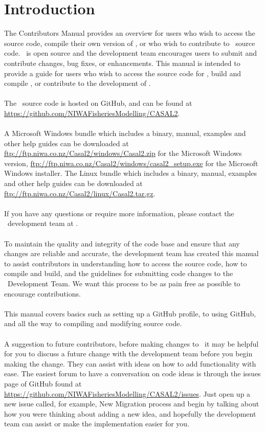 \section{Introduction\label{sec:Introduction}}
The Contributors Manual provides an overview for users who wish to access the source code, compile their own version of \CNAME , or who wish to contribute to \CNAME\ source code. \CNAME\ is open source and the development team encourages users to submit and contribute changes, bug fixes, or enhancements. This manual is intended to provide a guide for users who wish to access the source code for \CNAME , build and compile  \CNAME , or contribute to the development of \CNAME . 
\\\\
The \CNAME\ source code is hosted on GitHub, and can be found at \url{https://github.com/NIWAFisheriesModelling/CASAL2}.
\\\\
A Microsoft Windows bundle which includes a binary, manual, examples and other help guides can be downloaded at \url{ftp://ftp.niwa.co.nz/Casal2/windows/Casal2.zip} for the Microsoft Windows version, \url{ftp://ftp.niwa.co.nz/Casal2/windows/casal2_setup.exe} for the Microsoft Windows installer. The Linux bundle which includes a binary, manual, examples and other help guides can be downloaded at \url{ftp://ftp.niwa.co.nz/Casal2/linux/Casal2.tar.gz}.
\\\\
If you have any questions or require more information, please contact the \CNAME\ development team at \email.
\\\\
To maintain the quality and integrity of the code base and ensure that any changes are reliable and accurate, the development team has created this manual to assist contributors in understanding how to access the source code, how to compile and build, and the guidelines for submitting code changes to the \CNAME\ Development Team. We want this process to be as pain free as possible to encourage contributions. 
\\\\
This manual covers basics such as setting up a GitHub profile, to using GitHub, and all the way to compiling and modifying source code. 
\\\\
A suggestion to future contributors, before making changes to \CNAME\ it may be helpful for you to discuss a future change with the development team before you begin making the change. They can assist with ideas on how to add functionality with ease. The easiest forum to have a conversation on code ideas is through the issues page of GitHub found at \url{https://github.com/NIWAFisheriesModelling/CASAL2/issues}. Just open up a new issue called, for example, New Migration process and begin by talking about how you were thinking about adding a new idea, and hopefully the development team can assist or make the implementation easier for you.
